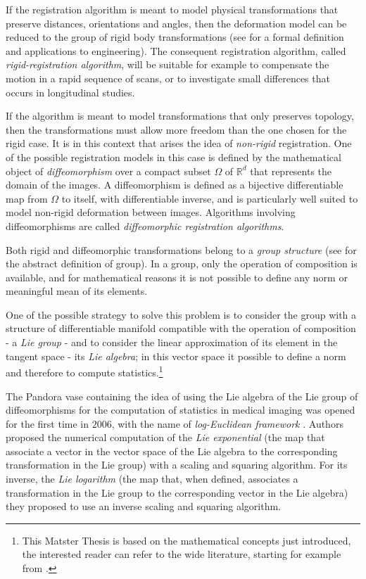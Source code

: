 If the registration algorithm is meant to model physical transformations that preserve distances, orientations and angles, then the deformation model can be reduced to the group of rigid body transformations (see \cite{gallier2011geometric} for a formal definition and applications to engineering). The consequent registration algorithm, called \emph{rigid-registration algorithm}, will be suitable for example to compensate the motion in a rapid sequence of scans, or to investigate small differences that occurs in longitudinal studies.

If the algorithm is meant to model transformations that only preserves topology, then the transformations must allow more freedom than the one chosen for the rigid case. It is in this context that arises the idea of \emph{non-rigid} registration. One of the possible registration models in this case is defined by the mathematical object of \emph{diffeomorphism} over a compact subset $\Omega$ of $\mathbb{R}^{d}$ that represents the domain of the images. A diffeomorphism is defined as a bijective differentiable map from $\Omega$ to itself, with differentiable inverse, and is particularly well suited to model non-rigid deformation between images. Algorithms involving diffeomorphisms are called \emph{diffeomorphic registration algorithms}.

Both rigid and diffeomorphic transformations belong to a \emph{group structure} (see \cite{artin2011algebra} for the abstract definition of group). In a group, only the operation of composition is available, and for mathematical reasons it is not possible to define any norm or meaningful mean of its elements. 

One of the possible strategy to solve this problem is to consider the group with a structure of differentiable manifold compatible with the operation of composition - a \emph{Lie group} - and to consider the linear approximation of its element in the tangent space - its \emph{Lie algebra}; in this vector space it possible to define a norm and therefore to compute statistics.\footnote{
	This Matster Thesis is based on the mathematical concepts just introduced, the interested reader can refer to the wide literature, starting for example from \cite{lee2012introduction, arnold2006ordinary, warner, do1976differential, misner1973gravitation, holm2009geometric}.
	}

The Pandora vase containing the idea of using the Lie algebra of the Lie group of diffeomorphisms for the computation of statistics in medical imaging was opened for the first time in $2006$, with the name of \emph{log-Euclidean framework} \cite{Arsigny:MRM:06}.
Authors proposed the numerical computation of the \emph{Lie exponential} (the map that associate a vector in the vector space of the Lie algebra to the corresponding transformation in the Lie group) with a scaling and squaring algorithm. For its inverse, the \emph{Lie logarithm} (the map that, when defined, associates a transformation in the Lie group to the corresponding vector in the Lie algebra) they proposed to use an inverse scaling and squaring algorithm.

